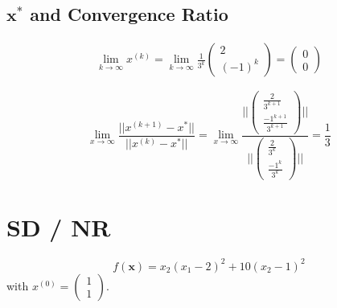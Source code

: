 \subsection{$\bm x^*$ and Convergence Ratio}

\begin{align*}
\lim_{k\to\infty} x^{(k)} = \lim_{k\to\infty} \frac{1}{3^k}\begin{pmatrix}2 \\ (-1)^k\end{pmatrix} = \begin{pmatrix}0 \\ 0\end{pmatrix}
\end{align*}

\begingroup
\renewcommand*{\arraystretch}{1.6}
\[
\lim_{x \to \infty} \frac{||x^{(k+1)} - x^*||}{||x^{(k)} - x^*||} = \lim_{x \to \infty}
\frac
{\Bigg|\Bigg|\begin{pmatrix}
\frac{2}{3^{k+1}}\\
\frac{-1^{k+1}}{3^{k+1}}
\end{pmatrix}\Bigg|\Bigg|}
{\Bigg|\Bigg|\begin{pmatrix}
\frac{2}{3^{k}}\\
\frac{-1^{k}}{3^{k}}
\end{pmatrix}\Bigg|\Bigg|}
 = \frac{1}{3}
\]
\endgroup




\section{SD / NR}
\[
f(\bm x) = x_2 (x_1 -2) ^2 + 10(x_2 - 1)^2
\]
with $x^{(0)} = \begin{pmatrix}1 \\ 1\end{pmatrix}$. 


